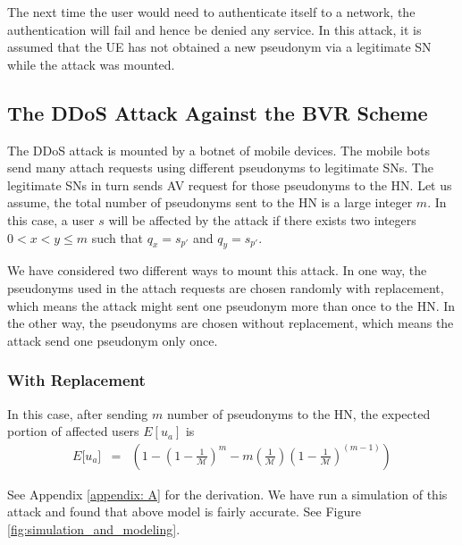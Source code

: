 \documentclass{llncs} %
\begin{document}

The next time the user would need to authenticate itself to a network, the authentication will fail and hence be denied any service. In this attack, it is assumed that the UE has not obtained a new pseudonym via a legitimate SN while the attack was mounted.

\subsection{The DDoS Attack Against the BVR Scheme} \label{sec:ddos_attack}
The DDoS attack is mounted by a botnet of mobile devices. The mobile bots send many attach requests using different pseudonyms to legitimate SNs. The legitimate SNs in turn sends AV request for those pseudonyms to the HN. Let us assume, the total number of pseudonyms sent to the HN is a large integer $m$. In this case, a user $s$ will be affected by the attack if there exists two integers $0 < x < y \leq m$ such that $q_{x} = s_{p'}$ and $q_{y} = s_{p'}$. 

We have considered two different ways to mount this attack. In one way, the pseudonyms used in the attach requests are chosen randomly with replacement, which means the attack might sent one pseudonym more than once to the HN. In the other way, the pseudonyms are chosen without replacement, which means the attack send one pseudonym only once.

\subsubsection{With Replacement}
In this case, after sending $m$ number of pseudonyms to the HN, the expected portion of affected users $E[u_a]$ is
\begin{eqnarray}
E\big[ u_a \big] &=& \left(1- \left(1 - \frac{1}{\mathcal{M}}\right)^m - m\left(\frac{1}{\mathcal{M}}\right)\left(1 - \frac{1}{\mathcal{M}}\right)^{\left(m-1 \right)} \right) \label{eqn:avg_with_replacement}
\end{eqnarray} 

See Appendix \ref{appendix: A} for the derivation. We have run a simulation of this attack and found that above model is fairly accurate. See Figure \ref{fig:simulation_and_modeling}.
\end{document}
